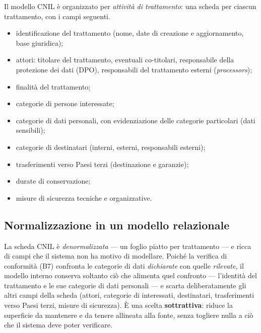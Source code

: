 Il modello CNIL è organizzato per \textit{attività di trattamento}: una scheda per ciascun trattamento, con i campi seguenti.
\begin{itemize}
	\item identificazione del trattamento (nome, date di creazione e aggiornamento, base giuridica);
	\item attori: titolare del trattamento, eventuali co-titolari, responsabile della protezione dei dati (DPO), responsabili del trattamento esterni (\textit{processors});
	\item finalità del trattamento;
	\item categorie di persone interessate;
	\item categorie di dati personali, con evidenziazione delle categorie particolari (dati sensibili);
	\item categorie di destinatari (interni, esterni, responsabili esterni);
	\item trasferimenti verso Paesi terzi (destinazione e garanzie);
	\item durate di conservazione;
	\item misure di sicurezza tecniche e organizzative.
\end{itemize}

\subsection{Normalizzazione in un modello relazionale}
\label{sub:ropa-modello}

La scheda CNIL è \textit{denormalizzata} --- un foglio piatto per trattamento --- e ricca di campi che il sistema non ha motivo di modellare. Poiché la verifica di conformità (B7) confronta le categorie di dati \textit{dichiarate} con quelle \textit{rilevate}, il modello interno conserva soltanto ciò che alimenta quel confronto --- l'identità del trattamento e le sue categorie di dati personali --- e scarta deliberatamente gli altri campi della scheda (attori, categorie di interessati, destinatari, trasferimenti verso Paesi terzi, misure di sicurezza). È una scelta \textbf{sottrattiva}: riduce la superficie da mantenere e da tenere allineata alla fonte, senza togliere nulla a ciò che il sistema deve poter verificare.


